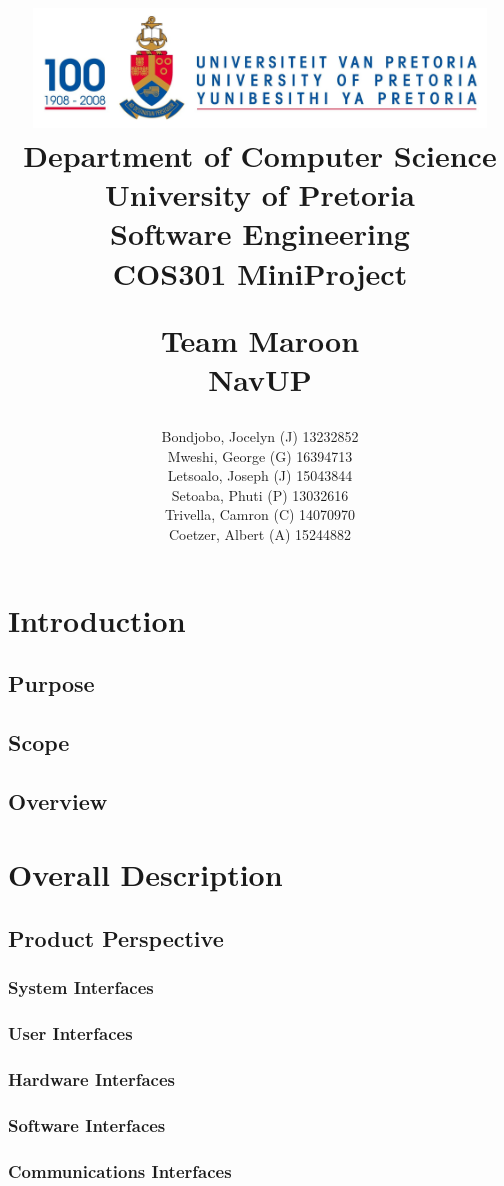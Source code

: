 \documentclass[a4paper,10pt]{article}
\title{\includegraphics[width=12cm]{Eeufeeslogo.jpg} \\
       Department of Computer Science \\
       University of Pretoria \\
       \vspace{0.5cm}
       Software Engineering\\
       COS301 MiniProject \\
       \vspace{0.5cm}
       \begin{large} \textbf{Team Maroon}\\ NavUP\end{large}}
\date{}
\author{Bondjobo, Jocelyn (J) 	13232852 		\\
		Mweshi, George (G)		16394713		\\
		Letsoalo, Joseph (J)	15043844		\\
		Setoaba, Phuti (P)		13032616		\\
		Trivella, Camron (C)	14070970		\\
		Coetzer, Albert (A)		15244882		\\
}
\begin{document}
\maketitle
\thispagestyle{empty}
\clearpage

\newpage
{}
\thispagestyle{empty}
\tableofcontents
\clearpage

\newpage
{}

\section{Introduction}

	\subsection{Purpose} 
	\subsection{Scope} 
	\subsection{Overview} 

\section{Overall Description}

	\subsection{Product Perspective}
	
		\subsubsection{System Interfaces}
		\subsubsection{User Interfaces}
		\subsubsection{Hardware Interfaces}
		\subsubsection{Software Interfaces}
		\subsubsection{Communications Interfaces}
\end{document}
